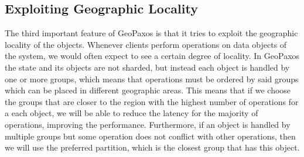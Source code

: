 \subsection{Exploiting Geographic Locality}
The third important feature of GeoPaxos is that it tries to exploit the geographic locality of the objects. Whenever clients perform operations on data objects of the system, we would often expect to see a certain degree of locality. In GeoPaxos the state and its objects are not sharded, but instead each object is handled by one or more groups, which means that operations must be ordered by said groups which can be placed in different geographic areas. This means that if we choose the groups that are closer to the region with the highest number of operations for a each object, we will be able to reduce the latency for the majority of operations, improving the performance. Furthermore, if an object is handled by multiple groups but some operation does not conflict with other operations, then we will use the preferred partition, which is the closest group that has this object.